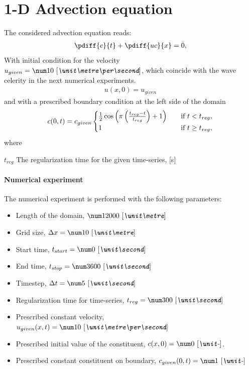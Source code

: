 \section{1-D Advection equation}
The considered advection equation reads:
\begin{align}
    \pdiff{c}{t} + \pdiff{uc}{x} = 0,
\end{align}
With initial condition for the velocity $u_{given} = \bqty{10}{\metre\per\second}$, which coincide with the wave celerity in the next numerical experiments.
\begin{align}
    u(x,0) = u_{given}
\end{align}
and with a prescribed boundary condition at the left side of the domain
\begin{align}
    c(0,t) = c_{given}
    \begin{cases}
        \frac{1}{2} \cos\left(\pi \left(\frac{t_{reg} - t}{t_{reg}}\right)+ 1\right) &\quad \text{if } t < t_{reg},
        \\
        1 &\quad \text{if } t \geq t_{reg},
    \end{cases}
\end{align}
where
\begin{symbollist}
    \item[$t_{reg}$] The regularization time for the given time-series, [\si{\second}]
\end{symbollist}
\paragraph*{Numerical experiment}
The numerical experiment is performed with the following parameters:
\begin{itemize}
    \item Length of the domain, $\bqty{12000}{\metre}$
    \item Grid size, $\Dx = \bqty{10}{\metre}$
    \item Start time, $t_{start} = \bqty{0}{\second}$
    \item End time, $t_{stop} = \bqty{3600}{\second}$
    \item Timestep, $\Dt = \bqty{5}{\second}$
    \item Regularization time for time-series, $t_{reg} = \bqty{300}{\second}$
    \item Prescribed constant velocity, $u_{given}(x,t) = \bqty{10}{\metre\per\second}$
    \item Prescribed initial value of the constituent, $c(x,0)= \bqty{0}{-}$.
    \item Prescribed constant constituent on boundary, $c_{given}(0,t) = \bqty{1}{-}$
\end{itemize}


